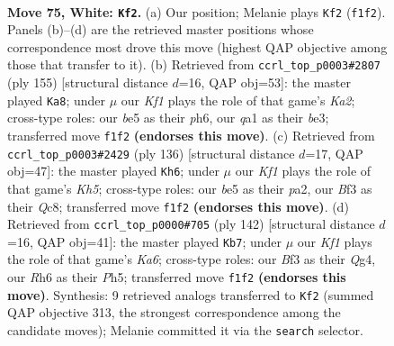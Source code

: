 \documentclass[11pt]{article}
\begin{document}
\clearpage

\begin{figure}[p]\centering
\begin{subfigure}{0.46\textwidth}\centering
\resizebox{\linewidth}{!}{%
\newchessgame
\chessboard[
  setfen={8/8/7R/4b3/8/1p1k1B2/8/q4K2 w - - 6 75},
  showmover=false,
  pgfstyle=straightmove, color=movearrow, markmove={f1-f2}
]}
\caption{}
\end{subfigure}\hfill
\begin{subfigure}{0.46\textwidth}\centering
\resizebox{\linewidth}{!}{%
\newchessgame
\chessboard[
  setfen={8/k7/6bP/8/2p4K/4B3/8/8 b - - 6 78},
  showmover=false,
  pgfstyle=straightmove, color=movearrow, markmove={a7-a8}
]}
\caption{}
\end{subfigure}
\\[4pt]
\begin{subfigure}{0.46\textwidth}\centering
\resizebox{\linewidth}{!}{%
\newchessgame
\chessboard[
  setfen={2Q5/4k1P1/8/q6K/8/8/p7/8 w - - 11 69},
  showmover=false,
  pgfstyle=straightmove, color=movearrow, markmove={h5-h6}
]}
\caption{}
\end{subfigure}\hfill
\begin{subfigure}{0.46\textwidth}\centering
\resizebox{\linewidth}{!}{%
\newchessgame
\chessboard[
  setfen={5b1k/8/K2q4/7P/6Q1/8/8/8 w - - 2 72},
  showmover=false,
  pgfstyle=straightmove, color=movearrow, markmove={a6-b7}
]}
\caption{}
\end{subfigure}
\caption{\textbf{Move 75, White: \texttt{Kf2}.} (a) Our position; Melanie plays \texttt{Kf2} (\texttt{f1f2}). Panels (b)--(d) are the retrieved master positions whose correspondence most drove this move (highest QAP objective among those that transfer to it). (b) Retrieved from \texttt{ccrl\_top\_p0003\#2807} (ply 155) [structural distance $d$=16, QAP obj=53]: the master played \texttt{Ka8}; under $\mu$ our \emph{Kf1} plays the role of that game's \emph{Ka2}; cross-type roles: our \emph{b}e5 as their \emph{p}h6, our \emph{q}a1 as their \emph{b}e3; transferred move \texttt{f1f2} \textbf{(endorses this move)}. (c) Retrieved from \texttt{ccrl\_top\_p0003\#2429} (ply 136) [structural distance $d$=17, QAP obj=47]: the master played \texttt{Kh6}; under $\mu$ our \emph{Kf1} plays the role of that game's \emph{Kh5}; cross-type roles: our \emph{b}e5 as their \emph{p}a2, our \emph{B}f3 as their \emph{Q}c8; transferred move \texttt{f1f2} \textbf{(endorses this move)}. (d) Retrieved from \texttt{ccrl\_top\_p0000\#705} (ply 142) [structural distance $d$=16, QAP obj=41]: the master played \texttt{Kb7}; under $\mu$ our \emph{Kf1} plays the role of that game's \emph{Ka6}; cross-type roles: our \emph{B}f3 as their \emph{Q}g4, our \emph{R}h6 as their \emph{P}h5; transferred move \texttt{f1f2} \textbf{(endorses this move)}. Synthesis: 9 retrieved analogs transferred to \texttt{Kf2} (summed QAP objective 313, the strongest correspondence among the candidate moves); Melanie committed it via the \texttt{search} selector.}
\label{fig:thought-m148}
\end{figure}
\end{document}
